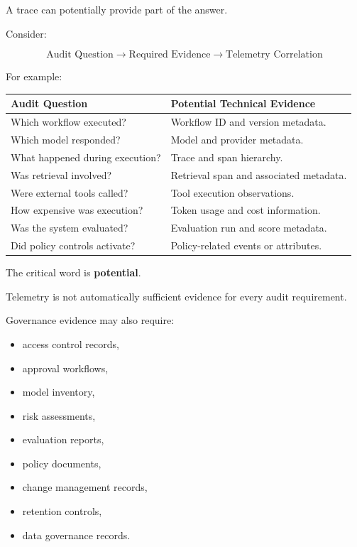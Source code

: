 \documentclass[11pt,a4paper]{article}
\begin{document}
A trace can potentially provide part of the answer.

Consider:

\[
\text{Audit Question}
\rightarrow
\text{Required Evidence}
\rightarrow
\text{Telemetry Correlation}
\]

For example:

\begin{table}[h]
\centering
\begin{tabular}{p{}p{}}
\toprule
\textbf{Audit Question} & \textbf{Potential Technical Evidence} \\
\midrule
Which workflow executed? &
Workflow ID and version metadata. \\
\addlinespace
Which model responded? &
Model and provider metadata. \\
\addlinespace
What happened during execution? &
Trace and span hierarchy. \\
\addlinespace
Was retrieval involved? &
Retrieval span and associated metadata. \\
\addlinespace
Were external tools called? &
Tool execution observations. \\
\addlinespace
How expensive was execution? &
Token usage and cost information. \\
\addlinespace
Was the system evaluated? &
Evaluation run and score metadata. \\
\addlinespace
Did policy controls activate? &
Policy-related events or attributes. \\
\bottomrule
\end{tabular}
\end{table}

The critical word is \textbf{potential}.

Telemetry is not automatically sufficient evidence for every audit requirement.

Governance evidence may also require:

\begin{itemize}
\item access control records,
\item approval workflows,
\item model inventory,
\item risk assessments,
\item evaluation reports,
\item policy documents,
\item change management records,
\item retention controls,
\item data governance records.
\end{itemize}
\end{document}
